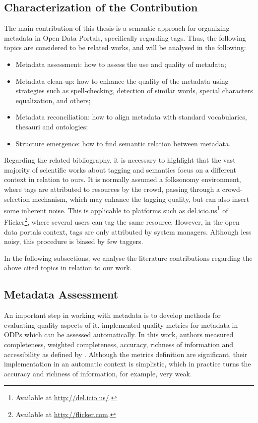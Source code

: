 \subsection{Characterization of the Contribution}

The main contribution of this thesis is a semantic approach for organizing metadata in Open Data Portals, specifically regarding tags.
Thus, the following topics are considered to be related works, and will be analysed in the following:
\begin{itemize}
	\item Metadata assessment: how to assess the use and quality of metadata;
	\item Metadata clean-up: how to enhance the quality of the metadata using strategies such as spell-checking, detection of similar words, special characters equalization, and others;
	\item Metadata reconciliation: how to align metadata with standard vocabularies, thesauri and ontologies;
	\item Structure emergence: how to find semantic relation between metadata.
\end{itemize}

Regarding the related bibliography, it is necessary to highlight that the vast majority of scientific works about tagging and semantics focus on a different context in relation to ours.
It is normally assumed a folksonomy environment, where tags are attributed to resources by the crowd, passing through a crowd-selection mechanism, which may enhance the tagging quality, but can also insert some inherent noise.
This is applicable to platforms such as del.icio.us\footnote{Available at \url{http://del.icio.us/}.} of Flicker\footnote{Available at \url{http://flicker.com}.}, where several users can tag the same resource.
However, in the open data portals context, tags are only attributed by system managers.
Although less noisy, this procedure is biased by few taggers.

In the following subsections, we analyse the literature contributions regarding the above cited topics in relation to our work.

\subsection{Metadata Assessment}
\label{sec:metadata_assessment}

An important step in working with metadata is to develop methods for evaluating quality aspects of it.
 implemented quality metrics for metadata in ODPs which can be assessed automatically.
In this work, authors measured completeness, weighted completeness, accuracy, richness of information and accessibility as defined by .
Although the metrics definition are significant, their implementation in an automatic context is simplistic, which in practice turns the accuracy and richness of information, for example, very weak.

